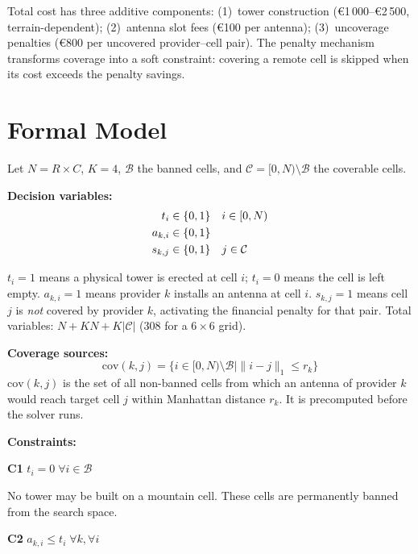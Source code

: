 \documentclass{llncs}
\begin{document}
Total cost has three additive components:
(1)~tower construction (€1\,000--€2\,500, terrain-dependent);
(2)~antenna slot fees (€100 per antenna);
(3)~uncoverage penalties (€800 per uncovered provider--cell pair).
The penalty mechanism transforms coverage into a soft constraint: covering a
remote cell is skipped when its cost exceeds the penalty savings.

\section{Formal Model}
\label{sec:model}

Let $N{=}R{\times}C$, $K{=}4$, $\mathcal{B}$ the banned cells, and
$\mathcal{C}{=}[0,N){\setminus}\mathcal{B}$ the coverable cells.

\smallskip\noindent\textbf{Decision variables:}
\begin{align}
t_i &\in \{0,1\} \quad i \in [0,N) \notag\\
a_{k,i} &\in \{0,1\} \notag\\
s_{k,j} &\in \{0,1\} \quad j \in \mathcal{C} \notag
\end{align}

$t_i = 1$ means a physical tower is erected at cell $i$; $t_i = 0$ means the
cell is left empty. $a_{k,i} = 1$ means provider $k$ installs an antenna at
cell $i$. $s_{k,j} = 1$ means cell $j$ is \emph{not} covered by provider $k$,
activating the financial penalty for that pair. Total variables:
$N + KN + K|\mathcal{C}|$ (308 for a $6{\times}6$ grid).

\smallskip\noindent\textbf{Coverage sources:}
\[
\mathrm{cov}(k,j) = \{ i \in [0,N){\setminus}\mathcal{B} \mid \|i{-}j\|_1 \leq r_k \}
\]
$\mathrm{cov}(k,j)$ is the set of all non-banned cells from which an antenna of
provider $k$ would reach target cell $j$ within Manhattan distance $r_k$.
It is precomputed before the solver runs.

\smallskip\noindent\textbf{Constraints:}

\noindent\textbf{C1} \quad $t_i = 0 \;\forall i \in \mathcal{B}$

\noindent No tower may be built on a mountain cell. These cells are permanently
banned from the search space.

\smallskip
\noindent\textbf{C2} \quad $a_{k,i} \leq t_i \;\forall k,\forall i$
\end{document}
